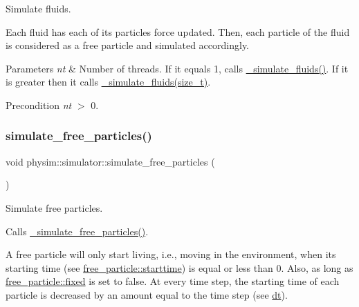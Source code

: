 Simulate fluids. 

Each fluid has each of its particle\textquotesingle{}s force updated. Then, each particle of the fluid is considered as a free particle and simulated accordingly.


\begin{DoxyParams}{Parameters}
{\em nt} & Number of threads. If it equals 1, calls \hyperlink{classphysim_1_1simulator_ac01677745377a9520453b73e199fcf99}{\+\_\+simulate\+\_\+fluids()}. If it is greater then it calls \hyperlink{classphysim_1_1simulator_a5b0b7e9c7790144f17d5de13c8d098dc}{\+\_\+simulate\+\_\+fluids(size\+\_\+t)}. \\
\hline
\end{DoxyParams}
\begin{DoxyPrecond}{Precondition}
{\itshape nt} $>$ 0. 
\end{DoxyPrecond}
\mbox{\label{classphysim_1_1simulator_ac836fc5c8ccf186b8030da54586a8b07}} 
\subsubsection{\texorpdfstring{simulate\+\_\+free\+\_\+particles()}{simulate\_free\_particles()}}
{\footnotesize\ttfamily void physim\+::simulator\+::simulate\+\_\+free\+\_\+particles (\begin{DoxyParamCaption}{ }\end{DoxyParamCaption})}



Simulate free particles. 

Calls \hyperlink{classphysim_1_1simulator_ae553797df3ee38cfe3c93bbc0b94be06}{\+\_\+simulate\+\_\+free\+\_\+particles()}.

A free particle will only start \textquotesingle{}living\textquotesingle{}, i.\+e., moving in the environment, when its starting time (see \hyperlink{classphysim_1_1particles_1_1free__particle_ad0379ba926ecc909bfbfb373045bfcf9}{free\+\_\+particle\+::starttime}) is equal or less than 0. Also, as long as \hyperlink{classphysim_1_1particles_1_1free__particle_a0f6d69caeac140abd74c7be4ed55eb74}{free\+\_\+particle\+::fixed} is set to false. At every time step, the starting time of each particle is decreased by an amount equal to the time step (see \hyperlink{classphysim_1_1simulator_a12a60d0ed819937b51ce50162dbdd6e1}{dt}).

